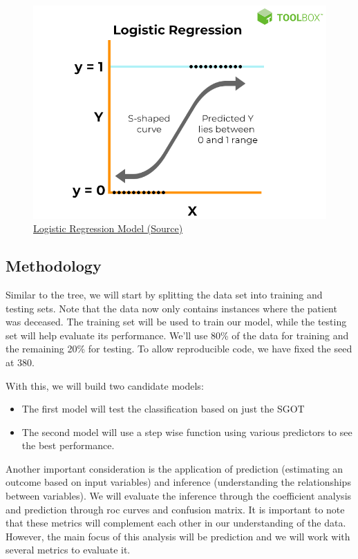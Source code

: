 \documentclass[
]{article}
\begin{document}
\begin{figure}
\centering
\includegraphics{46-4.png}
\caption{\ul{Logistic Regression Model
(\href{https://www.spiceworks.com/tech/artificial-intelligence/articles/what-is-logistic-regression/}{Source})}}
\end{figure}

\hypertarget{methodology-1}{%
\subsection{Methodology}\label{methodology-1}}

Similar to the tree, we will start by splitting the data set into
training and testing sets. Note that the data now only contains
instances where the patient was deceased. The training set will be used
to train our model, while the testing set will help evaluate its
performance. We'll use 80\% of the data for training and the remaining
20\% for testing. To allow reproducible code, we have fixed the seed at
380.

With this, we will build two candidate models:

\begin{itemize}
\item
  The first model will test the classification based on just the SGOT
\item
  The second model will use a step wise function using various
  predictors to see the best performance.
\end{itemize}

Another important consideration is the application of prediction
(estimating an outcome based on input variables) and inference
(understanding the relationships between variables). We will evaluate
the inference through the coefficient analysis and prediction through
roc curves and confusion matrix. It is important to note that these
metrics will complement each other in our understanding of the data.
However, the main focus of this analysis will be prediction and we will
work with several metrics to evaluate it.
\end{document}
